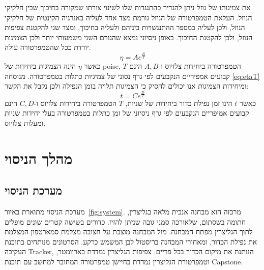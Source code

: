 \documentclass[10pt,a4paper]{article}
\newcommand{\textenglish}[1]{\foreignlanguage{english}{#1}}
\begin{document}
את צמיגותו של נוזל ניתן להגדיר כהתנגדות שלו לשינוי צורתו שמקורה בחיכוך שבין חלקיקי הנוזל. העלאת הטמפרטורה של הנוזל גורמת מצד אחד לעליה באנרגיה הקינטית של חלקיקי הנוזל, ולכן לעליה במספר ההתנגשויות ביניהם ולעליה בחיכוך, ומצד שני להקטנת צפיפות הנוזל, ולכן להקטנת החיכוך. באופן ניסיוני נמצא שהגורם השני משמעותי יותר ולכן הצמיגות יורדת ככל שהטמפרטורה עולה.
\begin{equation}\label{eq:etaT}
\eta = A e^{\frac{B}{T}}
\end{equation}
כאשר $\eta$ הינה הצמיגות ביחידות של \textenglish{poise}, $T$ הטמפרטורה ביחידות צלזיוס ו-$A, B$ הינם קבועים אמפיריים הנקבעים לפי גרף נסוני של צמיגיות כתלות בטמפרטורה. מנוסחה \eqref{eq:etaT} ומיחידות הצמיגות אנו יכולים להסיק כי הצמיגות תלויה בזמן הנפילה ולכן נקבל את הקשר:
\begin{equation}\label{eq:tT}
t = C e^{\frac{D}{T}}
\end{equation}
כאשר $t$ הינו זמן נפילת כדור ביחידות של שניות, $T$ הטמפרטורה ביחידות צלזיוס ו-$C, D$ הינם קבועים אמיפריים הנקבעים לפי גרף ניסיוני של זמן כתלות בטמפרטורה בעלי יחידות שניות ומעלות צלזיוס.

\section*{מהלך הניסוי}
\subsection*{מערכת הניסוי}
מערכת הניסוי מתוארת באיור~\ref{fig:system}. מרכזה הוא מבחנה אנכית מלאה בגליצרין, חתומה בשסתום, שלאורכה סמני גובה שניתן להזיז. כדורים בשישה קטרים שונים מופלים לתוך הגליצרין מפתח המבחנה. מול המבחנה מוצבת על חצובה מצלמת סמארטפון המצלמת את נפילת הכדור, ומאחורי המבחנה בריסטול לבן המשמש כרקע. הסרטונים מנותחים בתוכנת העקיבה \textenglish{Tracker}, הנותנת את מיקום הכדור בכל פריים. צפיפות הגליצרין נמדדת באריומטר, וטמפרטורת הגליצרין נמדדת בחיישן טמפרטורה המחובר למחשב עם תוכנת \textenglish{Capstone}.
\end{document}

